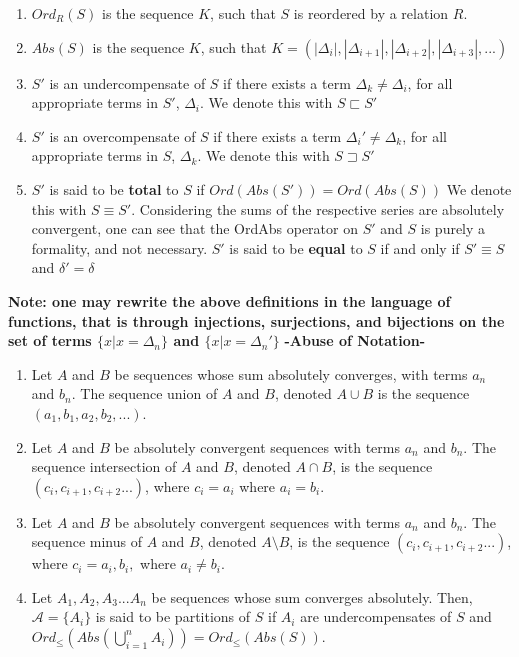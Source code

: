 \documentclass{article}
\begin{document}
\begin{enumerate}[i]
    \item $Ord_R(S)$ is the sequence $K$, such that $S$ is reordered by a relation $R$.
    \item $Abs(S)$ is the sequence $K$, such that $K = (|\Delta_i|,|\Delta_{i+1}|,|\Delta_{i+2}|,|\Delta_{i+3}|,... )$
    \item $S'$ is an undercompensate of $S$ if there exists a term $\Delta_k \neq \Delta_i$, for all appropriate terms in $S'$, 
          $\Delta_i$. We denote this with $S \sqsubset S'$
    \item $S'$ is an overcompensate of $S$ if there exists a term $\Delta_i' \neq \Delta_k$, for all appropriate terms in $S$, 
          $\Delta_k$. We denote this with $S \sqsupset S'$
    \item $S'$ is said to be \textbf{total} to $S$ if $Ord(Abs(S')) = Ord(Abs(S))$ We denote this with $S \equiv S'$. 
          Considering the sums of the respective series are absolutely convergent, one can see that the OrdAbs 
          operator on $S'$ and $S$ is purely a formality, and not necessary. $S'$ is said to be \textbf{equal} to $S$ 
          if and only if $S' \equiv S$ and $\delta' = \delta$
  \end{enumerate}
\textbf{Note:  one may rewrite the above definitions in the language of functions, that is through injections, 
surjections, and bijections on the set of terms $\{x | x = \Delta_n\}$ and $\{x | x = \Delta_n'\}$}
\newpage
\textbf{-Abuse of Notation-}
\begin{enumerate}[i]
    \item Let $A$ and $B$ be sequences whose sum absolutely converges, with terms $a_n$ and $b_n$. 
          The sequence union of $A$ and $B$, denoted $A \cup B$ is the sequence $(a_1, b_1, a_2, b_2, ...)$. 
    \item Let $A$ and $B$ be absolutely convergent sequences with terms $a_n$ and $b_n$.  
          The sequence intersection of $A$ and $B$, denoted $A \cap B$, is the sequence $(c_i, c_{i+1}, c_{i+2}...)$, 
          where $c_i = a_i$ where $a_i = b_i$.
    \item Let $A$ and $B$ be absolutely convergent sequences with terms $a_n$ and $b_n$.  
          The sequence minus of $A$ and $B$, denoted $A \setminus B$, is the sequence $(c_i, c_{i+1}, c_{i+2}...)$, 
          where $c_i = a_i, b_i,$ where $a_i \neq b_i$.
    \item Let $A_1, A_2, A_3... A_n$ be sequences whose sum converges absolutely. Then, $\mathcal{A} = \{A_i\}$ 
          is said to be partitions of $S$ if $A_i$ are undercompensates of $S$ and 
          $Ord_{\leq}(Abs(\bigcup\limits_{i=1}^{n} A_{i})) = Ord_{\leq}(Abs(S))$.
\end{enumerate}
\end{document}
